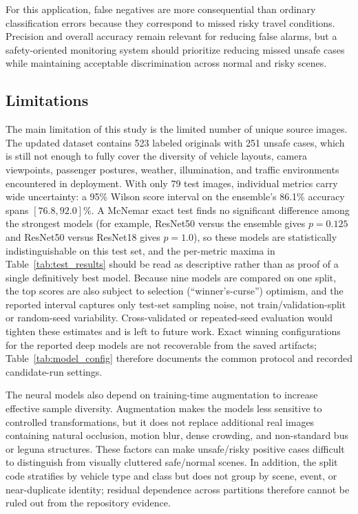 \documentclass{article}
\begin{document}
For this application, false negatives are more consequential than ordinary classification errors because they correspond to missed risky travel conditions. Precision and overall accuracy remain relevant for reducing false alarms, but a safety-oriented monitoring system should prioritize reducing missed unsafe cases while maintaining acceptable discrimination across normal and risky scenes.

\subsection{Limitations}
The main limitation of this study is the limited number of unique source images. The updated dataset contains 523 labeled originals with 251 unsafe cases, which is still not enough to fully cover the diversity of vehicle layouts, camera viewpoints, passenger postures, weather, illumination, and traffic environments encountered in deployment. With only 79 test images, individual metrics carry wide uncertainty: a 95\% Wilson score interval on the ensemble's 86.1\% accuracy spans $[76.8, 92.0]\%$. A McNemar exact test finds no significant difference among the strongest models (for example, ResNet50 versus the ensemble gives $p = 0.125$ and ResNet50 versus ResNet18 gives $p = 1.0$), so these models are statistically indistinguishable on this test set, and the per-metric maxima in Table~\ref{tab:test_results} should be read as descriptive rather than as proof of a single definitively best model. Because nine models are compared on one split, the top scores are also subject to selection (``winner's-curse'') optimism, and the reported interval captures only test-set sampling noise, not train/validation-split or random-seed variability. Cross-validated or repeated-seed evaluation would tighten these estimates and is left to future work. Exact winning configurations for the reported deep models are not recoverable from the saved artifacts; Table~\ref{tab:model_config} therefore documents the common protocol and recorded candidate-run settings.

The neural models also depend on training-time augmentation to increase effective sample diversity. Augmentation makes the models less sensitive to controlled transformations, but it does not replace additional real images containing natural occlusion, motion blur, dense crowding, and non-standard bus or leguna structures. These factors can make unsafe/risky positive cases difficult to distinguish from visually cluttered safe/normal scenes. In addition, the split code stratifies by vehicle type and class but does not group by scene, event, or near-duplicate identity; residual dependence across partitions therefore cannot be ruled out from the repository evidence.
\end{document}
